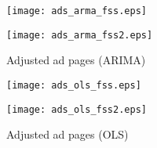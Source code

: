 \documentclass[10pt,a4paper]{scrreprt}
\begin{document}
\begin{figure}[H]
\caption{Adjusted ad pages (ARIMA)}
\begin{minipage}[hbt]{7cm}
	\centering
	\texttt{[image: ads\_arma\_fss.eps]}
\end{minipage}
\hfill
\begin{minipage}[hbt]{7cm}
	\centering
	\texttt{[image: ads\_arma\_fss2.eps]}
\end{minipage}
\label{fig:fss_arima2}
\end{figure}

\begin{figure}[H]
\caption{Adjusted ad pages (OLS)}
\begin{minipage}[hbt]{7cm}
	\centering
	\texttt{[image: ads\_ols\_fss.eps]}
\end{minipage}
\hfill
\begin{minipage}[hbt]{7cm}
	\centering
	\texttt{[image: ads\_ols\_fss2.eps]}
\end{minipage}
\label{fig:fss_ols2}
\end{figure}
\end{document}
